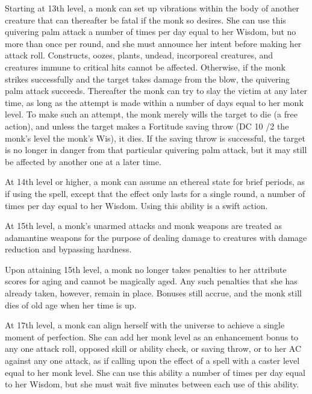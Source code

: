  Starting at 13th level, a monk can set up vibrations within the body of another creature that can thereafter be fatal if the monk so desires. She can use this quivering palm attack a number of times per day equal to her Wisdom, but no more than once per round, and she must announce her intent before making her attack roll. Constructs, oozes, plants, undead, incorporeal creatures, and creatures immune to critical hits cannot be affected. Otherwise, if the monk strikes successfully and the target takes damage from the blow, the quivering palm attack succeeds. Thereafter the monk can try to slay the victim at any later time, as long as the attempt is made within a number of days equal to her monk level. To make such an attempt, the monk merely wills the target to die (a free action), and unless the target makes a Fortitude saving throw (DC 10 /2 the monk's level \add the monk's Wis), it dies. If the saving throw is successful, the target is no longer in danger from that particular quivering palm attack, but it may still be affected by another one at a later time.

 At 14th level or higher, a monk can assume an ethereal state for brief periods, as if using the  spell, except that the effect only lasts for a single round, a number of times per day equal to her Wisdom. Using this ability is a swift action.

 At 15th level, a monk's unarmed attacks and monk weapons are treated as adamantine weapons for the purpose of dealing damage to creatures with damage reduction and bypassing hardness.

 Upon attaining 15th level, a monk no longer takes penalties to her attribute scores for aging and cannot be magically aged. Any such penalties that she has already taken, however, remain in place. Bonuses still accrue, and the monk still dies of old age when her time is up.

 At 17th level, a monk can align herself with the universe to achieve a single moment of perfection. She can add her monk level as an enhancement bonus to any one attack roll, opposed skill or ability check, or saving throw, or to her AC against any one attack, as if calling upon the effect of a  spell with a caster level equal to her monk level. She can use this ability a number of times per day equal to her Wisdom, but she must wait five minutes between each use of this ability.

